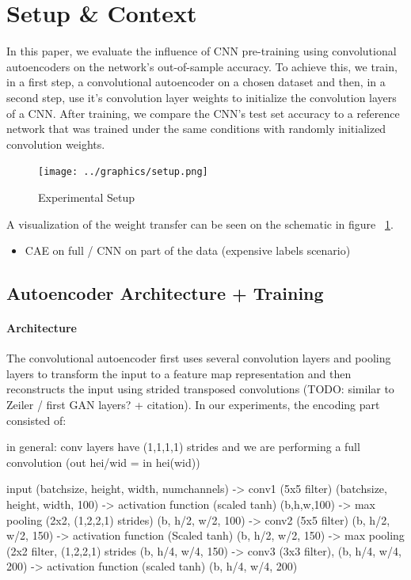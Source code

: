 \documentclass[draft]{article}
\begin{document}
\section{Setup \& Context}
  
  In this paper, we evaluate the influence of CNN pre-training using convolutional autoencoders on the network's out-of-sample accuracy. To achieve this, we train, in a first step, a convolutional autoencoder on a chosen dataset and then, in a second step, use it's convolution layer weights to initialize the convolution layers of a CNN. After training, we compare the CNN's test set accuracy to a reference network that was trained under the same conditions with randomly initialized convolution weights. 

  \begin{figure}[h]
    \centering
    \texttt{[image: ../graphics/setup.png]}
    \caption{Experimental Setup}
    \label{fig:experimental_setup}
  \end{figure}

  A visualization of the weight transfer can be seen on the schematic in figure ~\ref{fig:experimental_setup}. 

  \begin{itemize}
    \item CAE on full / CNN on part of the data (expensive labels scenario)
  \end{itemize}

  \subsection{Autoencoder Architecture + Training}

    \paragraph{Architecture}
    The convolutional autoencoder first uses several convolution layers and pooling layers to transform the input to a feature map representation and then reconstructs the input using strided transposed convolutions (TODO: similar to Zeiler / first GAN layers? + citation). In our experiments, the encoding part consisted of:

    in general: conv layers have (1,1,1,1) strides and we are performing a full convolution (out hei/wid = in hei(wid))

    input (batchsize, height, width, numchannels) -> conv1 (5x5 filter) (batchsize, height, width, 100) -> activation function (scaled tanh) (b,h,w,100) -> max pooling (2x2, (1,2,2,1) strides) (b, h/2, w/2, 100) -> conv2 (5x5 filter) (b, h/2, w/2, 150) -> activation function (Scaled tanh) (b, h/2, w/2, 150) -> max  pooling (2x2 filter, (1,2,2,1) strides (b, h/4, w/4, 150) -> conv3 (3x3 filter), (b, h/4, w/4, 200) -> activation function (scaled tanh) (b, h/4, w/4, 200) 
\end{document}
